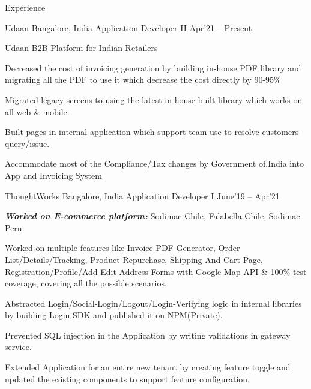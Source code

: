 \documentclass{resume} %
\begin{document}
\begin{rSection}{Experience}

  \begin{rWorkSection}{\Large Udaan}
                     {Bangalore, India}
                     {Application Developer II}
                     {Apr'21 -- Present} {
    \href{https://udaan.com}{Udaan B2B Platform for Indian Retailers}
    \item Decreased the cost of invoicing generation by building in-house PDF library and migrating all the PDF to use it which decrease the cost directly by 90-95\%
    \item Migrated legacy screens to using the latest in-house built library which works on all web & mobile.
    \item Built pages in internal application which support team use to resolve customers query/issue.
    \item Accommodate most of the Compliance/Tax changes by Government of.India into App and Invoicing System
  }
  \end{rWorkSection}
  \begin{rWorkSection}{\Large ThoughtWorks}
                     {Bangalore, India}
                     {Application Developer I}
                     {June'19 -- Apr'21} {
    {\it\bf Worked on E-commerce platform:} \href{https://www.sodimac.cl/sodimac-cl/}{Sodimac Chile}, \href{https://www.falabella.com/falabella-cl/}{Falabella Chile},  \href{https://www.sodimac.com.pe/sodimac-pe/}{Sodimac Peru}.
    \item Worked on multiple features like Invoice PDF Generator, Order List/Details/Tracking, Product Repurchase, Shipping And Cart Page, Registration/Profile/Add-Edit Address Forms with Google Map API \& 100\% test coverage, covering all the possible scenarios.
    \item Abstracted Login/Social-Login/Logout/Login-Verifying logic in internal libraries by building Login-SDK and published it on NPM(Private).
    \item Prevented SQL injection in the Application by writing validations in gateway service.
    \item Extended Application for an entire new tenant by creating feature toggle and updated the existing components to support feature configuration.
  }
  \end{rWorkSection}


\end{rSection}
\end{document}
